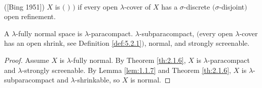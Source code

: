 \documentclass[main.tex]{subfiles}
\begin{document}
{ \label{def:2.1.7}
	\textup{([Bing 1951]\textsuperscript{\cite{Bing}})} $X$ is 
$($
$)$
$)$
if every open $\lambda$-cover of $X$ has a 
$\sigma$-discrete $(\sigma$-disjoint$)$ open refinement.
}

{\corollary{} \label{cor:2.1.8}
	A $\lambda$-fully normal space is $\lambda$-paracompact.
  $\lambda$-subparacompact, 
  $($every open $\lambda$-cover 
  has an open shrink, see Definition \ref{def:5.2.1}$)$, normal, and strongly screenable.
}

\begin{proof}
Assume $X$ is $\lambda$-fully normal. By Theorem \ref{th:2.1.6}, 
$X$ is $\lambda$-paracompact 
and $\lambda$-strongly screenable. By Lemma \ref{lem:1.1.7} and 
Theorem \ref{th:2.1.6}, $X$ is
$\lambda$-subparacompact and $\lambda$-shrinkable, so $X$ is normal.
\end{proof}
\end{document}
